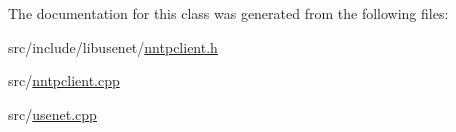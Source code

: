 The documentation for this class was generated from the following files\+:\begin{DoxyCompactItemize}
\item 
src/include/libusenet/\hyperlink{nntpclient_8h}{nntpclient.\+h}\item 
src/\hyperlink{nntpclient_8cpp}{nntpclient.\+cpp}\item 
src/\hyperlink{usenet_8cpp}{usenet.\+cpp}\end{DoxyCompactItemize}
